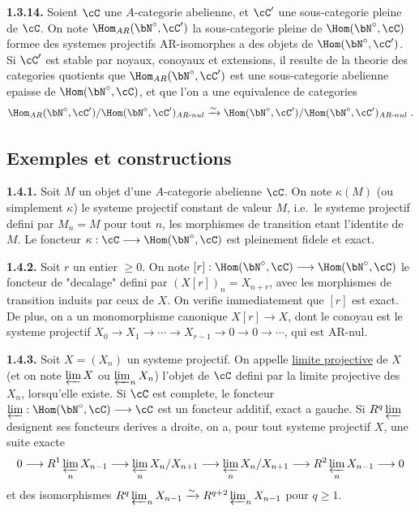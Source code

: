\medskip
\noindent\textbf{1.3.14.} Soient $\cC$ une $A$-categorie abelienne, et $\cC'$ une sous-categorie pleine de $\cC$. On note $\Hom_{AR}(\bN^\circ, \cC')$ la sous-categorie pleine de $\Hom(\bN^\circ, \cC)$ formee des systemes projectifs AR-isomorphes a des objets de $\Hom(\bN^\circ, \cC')$. Si $\cC'$ est stable par noyaux, conoyaux et extensions, il resulte de la theorie des categories quotients que $\Hom_{AR}(\bN^\circ, \cC')$ est une sous-categorie abelienne epaisse de $\Hom(\bN^\circ, \cC)$, et que l'on a une equivalence de categories
\[
\Hom_{AR}(\bN^\circ, \cC') / \Hom(\bN^\circ, \cC')_{AR\text{-}nul} \xrightarrow{\sim} \Hom(\bN^\circ, \cC') / \Hom(\bN^\circ, \cC')_{AR\text{-}nul}\;.
\]


\subsection{Exemples et constructions}

\medskip
\noindent\textbf{1.4.1.} Soit $M$ un objet d'une $A$-categorie abelienne $\cC$. On note $\kappa(M)$ (ou simplement $\kappa$) le systeme projectif constant de valeur $M$, i.e.\ le systeme projectif defini par $M_n = M$ pour tout $n$, les morphismes de transition etant l'identite de $M$. Le foncteur $\kappa : \cC \longrightarrow \Hom(\bN^\circ, \cC)$ est pleinement fidele et exact.

\medskip
\noindent\textbf{1.4.2.} Soit $r$ un entier $\geq 0$. On note $[r] : \Hom(\bN^\circ, \cC) \longrightarrow \Hom(\bN^\circ, \cC)$ le foncteur de "decalage" defini par $(X[r])_n = X_{n+r}$, avec les morphismes de transition induits par ceux de $X$. On verifie immediatement que $[r]$ est exact. De plus, on a un monomorphisme canonique $X[r] \longrightarrow X$, dont le conoyau est le systeme projectif $X_0 \longrightarrow X_1 \longrightarrow \cdots \longrightarrow X_{r-1} \longrightarrow 0 \longrightarrow 0 \longrightarrow \cdots$, qui est AR-nul.

\medskip
\noindent\textbf{1.4.3.} Soit $X = (X_n)$ un systeme projectif. On appelle \underline{limite projective} de $X$ (et on note $\varprojlim X$ ou $\varprojlim_n X_n$) l'objet de $\cC$ defini par la limite projective des $X_n$, lorsqu'elle existe. Si $\cC$ est complete, le foncteur $\varprojlim : \Hom(\bN^\circ, \cC) \longrightarrow \cC$ est un foncteur additif, exact a gauche. Si $R^q \varprojlim$ designent ses foncteurs derives a droite, on a, pour tout systeme projectif $X$, une suite exacte
\[
0 \longrightarrow R^1 \varprojlim_n X_{n-1} \longrightarrow \varprojlim_n X_n / X_{n+1} \longrightarrow \varprojlim_n X_n / X_{n+1} \longrightarrow R^2 \varprojlim_n X_{n-1} \longrightarrow 0
\]
et des isomorphismes $R^q \varprojlim_n X_{n-1} \xrightarrow{\sim} R^{q+2} \varprojlim_n X_{n-1}$ pour $q \geq 1$.

